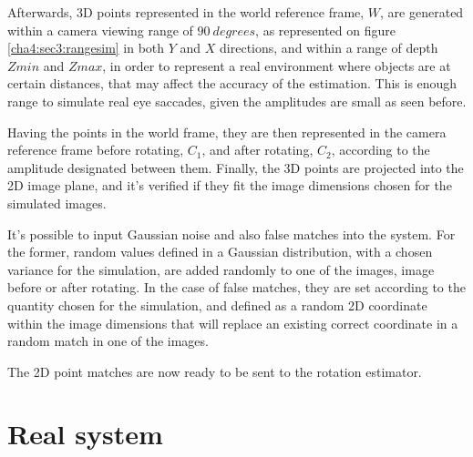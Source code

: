 Afterwards, 3D points represented in the world reference frame, ${W}$, are generated within a camera viewing range of $90 \ degrees$, as represented on figure \ref{cha4:sec3:rangesim} in both $Y$ and $X$ directions, and within a range of depth $Zmin$ and $Zmax$, in order to represent a real environment where objects are at certain distances, that may affect the accuracy of the estimation. This is enough range to simulate real eye saccades, given the amplitudes are small as seen before. 

Having the points in the world frame, they are then represented in the camera reference frame before rotating, ${C_1}$, and after rotating, ${C_2}$, according to the amplitude designated between them. Finally, the 3D points are projected into the 2D image plane, and it's verified if they fit the image dimensions chosen for the simulated images.

It's possible to input Gaussian noise and also false matches into the system. For the former, random values defined in a Gaussian distribution, with a chosen variance for the simulation, are added randomly to one of the images, image before or after rotating. In the case of false matches, they are set according to the quantity chosen for the simulation, and defined as a random 2D coordinate within the image dimensions that will replace an existing correct coordinate in a random match in one of the images.

The 2D point matches are now ready to be sent to the rotation estimator.

\section{Real system}

